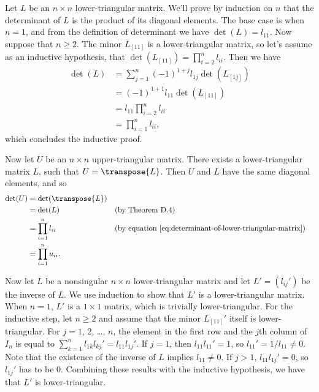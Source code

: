 Let $L$ be an $n\times n$ lower-triangular matrix.
We'll prove by induction on $n$ that the determinant of $L$ is the product of its diagonal elements.
The base case is when $n=1$, and from the definition of determinant we have $\det(L)=l_{11}$.
Now suppose that $n\ge2$.
The minor $L_{[11]}$ is a lower-triangular matrix, so let's assume as an inductive hypothesis, that $\det(L_{[11]})=\prod_{i=2}^nl_{ii}$.
Then we have
\begin{align} \label{eq:determinant-of-lower-triangular-matrix}
    \det(L) &= \sum_{j=1}^n(-1)^{1+j}l_{1j}\det(L_{[1j]}) \nonumber \\
    &= (-1)^{1+1}l_{11}\det(L_{[11]}) \nonumber \\
    &= l_{11}\prod_{i=2}^nl_{ii} \nonumber \\
    &= \prod_{i=1}^nl_{ii},
\end{align}
which concludes the inductive proof.

Now let $U$ be an $n\times n$ upper-triangular matrix.
There exists a lower-triangular matrix $L$, such that $U=\transpose{L}$.
Then $U$ and $L$ have the same diagonal elements, and so
\begin{align*}
    \det(U) &= \det(\transpose{L}) \\
    &= \det(L) && \text{(by Theorem D.4)} \\
    &= \prod_{i=1}^nl_{ii} && \text{(by equation \eqref{eq:determinant-of-lower-triangular-matrix})} \\
    &= \prod_{i=1}^nu_{ii}.
\end{align*}

Now let $L$ be a nonsingular $n\times n$ lower-triangular matrix and let $L'=(l_{ij}')$ be the inverse of $L$.
We use induction to show that $L'$ is a lower-triangular matrix.
When $n=1$, $L'$ is a $1\times1$ matrix, which is trivially lower-triangular.
For the inductive step, let $n\ge2$ and assume that the minor $L_{[11]}'$ itself is lower-triangular.
For $j=1$, 2, \dots, $n$, the element in the first row and the $j$th column of $I_n$ is equal to $\sum_{k=1}^nl_{1k}l_{kj}'=l_{11}l_{1j}'$.
If $j=1$, then $l_{11}l_{11}'=1$, so $l_{11}'=1/l_{11}\ne0$.
Note that the existence of the inverse of $L$ implies $l_{11}\ne0$.
If $j>1$, $l_{11}l_{1j}'=0$, so $l_{1j}'$ has to be 0.
Combining these results with the inductive hypothesis, we have that $L'$ is lower-triangular.
